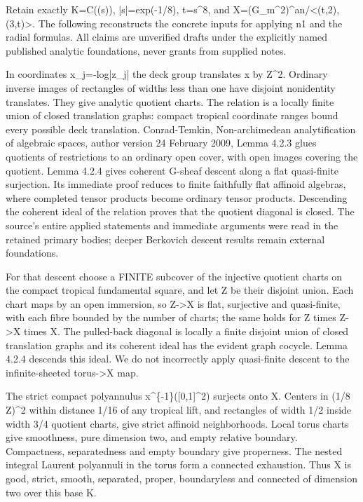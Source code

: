 \documentclass[11pt]{article}
\begin{document}
Retain exactly K=C((s)), |s|=exp(-1/8), t=s\textasciicircum{}8, and X=(G\_m\textasciicircum{}2)\textasciicircum{}an/<(t,2),(3,t)>. The following reconstructs the concrete inputs for applying n1 and the radial formulas. All claims are unverified drafts under the explicitly named published analytic foundations, never grants from supplied notes.

In coordinates x\_j=-log|z\_j| the deck group translates x by Z\textasciicircum{}2. Ordinary inverse images of rectangles of widths less than one have disjoint nonidentity translates. They give analytic quotient charts. The relation is a locally finite union of closed translation graphs: compact tropical coordinate ranges bound every possible deck translation. Conrad-Temkin, Non-archimedean analytification of algebraic spaces, author version 24 February 2009, Lemma 4.2.3 glues quotients of restrictions to an ordinary open cover, with open images covering the quotient. Lemma 4.2.4 gives coherent G-sheaf descent along a flat quasi-finite surjection. Its immediate proof reduces to finite faithfully flat affinoid algebras, where completed tensor products become ordinary tensor products. Descending the coherent ideal of the relation proves that the quotient diagonal is closed. The source's entire applied statements and immediate arguments were read in the retained primary bodies; deeper Berkovich descent results remain external foundations.

For that descent choose a FINITE subcover of the injective quotient charts on the compact tropical fundamental square, and let Z be their disjoint union. Each chart maps by an open immersion, so Z->X is flat, surjective and quasi-finite, with each fibre bounded by the number of charts; the same holds for Z times Z->X times X. The pulled-back diagonal is locally a finite disjoint union of closed translation graphs and its coherent ideal has the evident graph cocycle. Lemma 4.2.4 descends this ideal. We do not incorrectly apply quasi-finite descent to the infinite-sheeted torus->X map.

The strict compact polyannulus x\textasciicircum{}\{-1\}([0,1]\textasciicircum{}2) surjects onto X. Centers in (1/8 Z)\textasciicircum{}2 within distance 1/16 of any tropical lift, and rectangles of width 1/2 inside width 3/4 quotient charts, give strict affinoid neighborhoods. Local torus charts give smoothness, pure dimension two, and empty relative boundary. Compactness, separatedness and empty boundary give properness. The nested integral Laurent polyannuli in the torus form a connected exhaustion. Thus X is good, strict, smooth, separated, proper, boundaryless and connected of dimension two over this base K.
\end{document}
